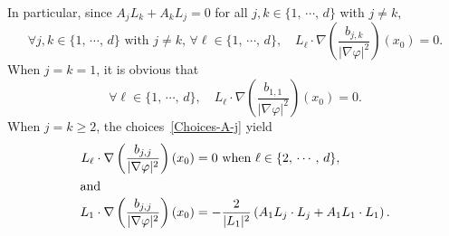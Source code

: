 \documentclass[10pt]{amsart}
\theoremstyle{definition}\newtheorem{defi}[theo]{Definition}\newtheorem{rema}[theo]{Remark}\newtheorem{exam}[theo]{Example}\newtheorem{exem}[theo]{Example}\newtheorem{nota}[theo]{Notation}
\renewcommand{\geq}{\geqslant}
\let\oldforall\forall
\renewcommand*{\forall}{\mathrel{\oldforall}}
\begin{document}
In particular, since $A_j L_k + A_k L_j = 0$ for all $j, k \in \{1,\, \cdots,\, d\}$ with $j \neq k$,
\[
\forall j, k \in \{1,\, \cdots,\, d\} \text{ with }j \neq k, \,
\forall \ell \in \{1,\, \cdots,\, d\}, \quad L_\ell \cdot \nabla \left(\frac{b_{j,k}}{|\nabla \varphi|^2} \right) (x_0) = 0.
\]
When $j = k = 1$, it is obvious that
\[
\forall \ell \in \{1,\, \cdots,\, d\}, \quad L_\ell \cdot \nabla \left(\frac{b_{1,1}}{|\nabla \varphi|^2} \right) (x_0) = 0.
\]
When $j = k \geq 2$, the choices~\eqref{Choices-A-j} yield
\begin{align*}
L_\ell \cdot \nabla \left(\frac{b_{j,j}}{|\nabla \varphi|^2} \right) (x_0) &= 0 \text{ when } \ell \in \{2,\, \cdots,\, d \},
\\
\intertext{and}
L_1 \cdot \nabla \left(\frac{b_{j,j}}{|\nabla \varphi|^2} \right) (x_0) &= -\frac{2}{|L_1|^2} \left(A_1 L_j \cdot L_j + A_1 L_1 \cdot L_1\right).
\end{align*}
\end{document}
